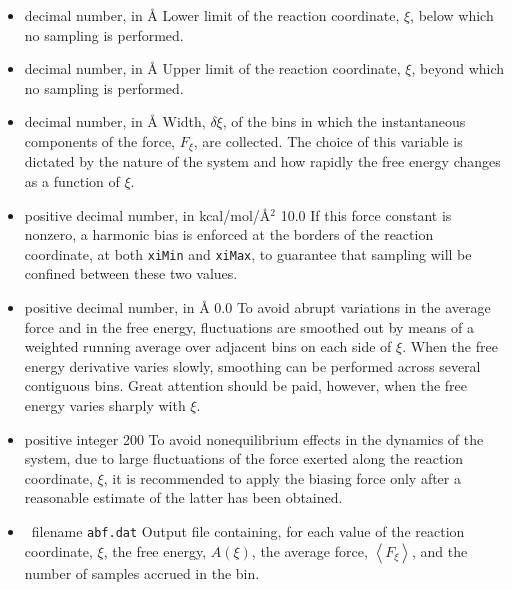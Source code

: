 \begin{itemize}
\item
{}
{decimal number, in \AA}
{Lower limit of the reaction coordinate, $\xi$, below which no
 sampling is performed.}


\item
{}
{decimal number, in \AA}
{Upper limit of the reaction coordinate, $\xi$, beyond which no
 sampling is performed.}


\item
{}
{decimal number, in \AA}
{Width, $\delta\xi$, of the bins in which the instantaneous components
 of the force, $F_\xi$, are collected. The choice of this
 variable is dictated by the nature of the system and how rapidly
 the free energy changes as a function of $\xi$.}


\item
{}
{positive decimal number, in kcal/mol/\AA$^2$}
{10.0}
{If this force constant is nonzero, a harmonic bias is enforced at
 the borders of the reaction coordinate,
 \ie at both {\tt xiMin} and {\tt xiMax}, to guarantee that sampling
 will be confined between these two values.}


\item
{}
{positive decimal number, in \AA}
{0.0}
{To avoid abrupt variations in the average force and in the free energy,
 fluctuations are smoothed out by means of a weighted running average over
 adjacent bins on each side of $\xi$. When the free energy derivative varies
 slowly, smoothing can be performed across several contiguous bins. Great attention
 should be paid, however, when the free energy varies sharply with $\xi$.}


\item {}
{positive integer}
{200}
{To avoid nonequilibrium effects in the dynamics of the system, due to large
 fluctuations of the force exerted along the reaction coordinate, $\xi$, it
 is recommended to apply the biasing force only after a reasonable estimate
 of the latter has been obtained.}


\item
{}
{\unix \ filename}
{\texttt{abf.dat}}
{Output file containing, for each value of the reaction
 coordinate, $\xi$, the free energy, $A(\xi)$, the average
 force, $\left\langle F_\xi \right\rangle$, and the number
 of samples accrued in the bin.}



\end{itemize}
